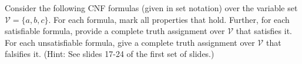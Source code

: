 \documentclass[addpoints,12pt]{exam}
\newcommand{\checkedcorrectchoice}[1]{\correctchoice \textbf{#1}}
\begin{document}
 

\begin{questions}

\question[10] 

\vspace*{5pt}
Consider the following CNF formulas (given in set notation) over the variable set
$\mathcal{V} = \{a,b,c\}$.
For each formula, mark all properties that hold.
Further, for each satisfiable formula, provide a complete truth assignment over $\mathcal{V}$ that
satisfies it.
For each unsatisfiable formula, give a complete truth assignment over $\mathcal{V}$ that
falsifies it. (Hint: See slides 17-24 of the first set of slides.)
\vspace*{5pt}

\end{questions}
\end{document}
